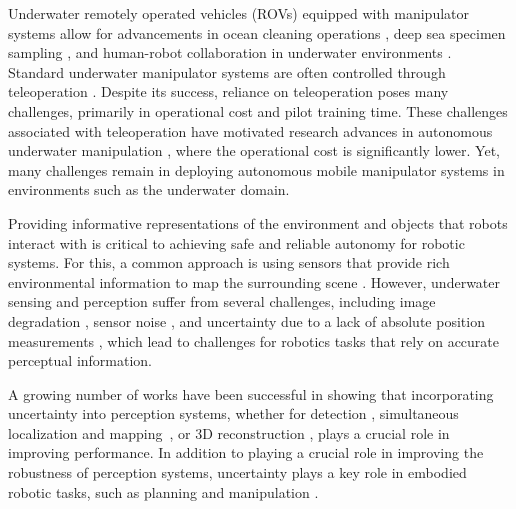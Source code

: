 Underwater remotely operated vehicles (ROVs) equipped with manipulator systems allow for advancements in ocean cleaning operations \cite{guimond_finding_plastic_2024}, deep sea specimen sampling \cite{mazzeo_marine_2022}, and human-robot collaboration in underwater environments \cite{feng_overview_2020}. 
Standard underwater manipulator systems are often controlled through teleoperation \cite{sivcev_underwater_2018}. 
Despite its success, reliance on teleoperation poses many challenges, primarily in operational cost and pilot training time.
These challenges associated with teleoperation have motivated research advances in autonomous underwater manipulation \cite{petillot_underwater_2019,micatka_grasp_volumes_2024}, where the operational cost is significantly lower.
Yet, many challenges remain in deploying autonomous mobile manipulator systems in environments such as the underwater domain.

Providing informative representations of the environment and objects that robots interact with is critical to achieving safe and reliable autonomy for robotic systems.
For this, a common approach is using sensors that provide rich environmental information to map the surrounding scene \cite{wang_real-time_2023, chen_monorun_2021, song2024turtlmap}. 
However, underwater sensing and perception suffer from several challenges, including image degradation \cite{mobley_light_1994, li_watergan_2017}, sensor noise \cite{song_uncertainty-aware_2023}, and uncertainty due to a lack of absolute position measurements \cite{rahman_svin2_2022}, which lead to challenges for robotics tasks that rely on accurate perceptual information.

A growing number of works have been successful in showing that incorporating uncertainty into perception systems, whether for detection \cite{kendall-what-uncertainties}, simultaneous localization and mapping~\cite{song_uncertainty-aware_2023}, or 3D reconstruction \cite{rosinol_probabilistic_2022,goli2023, ulusoy_patches_2016}, plays a crucial role in improving performance.
In addition to playing a crucial role in improving the robustness of perception systems, uncertainty plays a key role in embodied robotic tasks, such as planning and manipulation \cite{pmlr-v164-saund22a}. 

